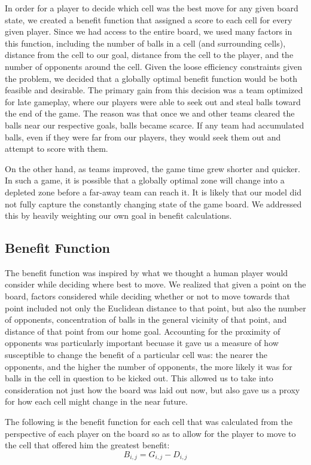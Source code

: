 \documentclass[
10pt, %
letterpaper, %
oneside, %
headinclude,footinclude, %
english
]{article}
\begin{document}
In order for a player to decide which cell was the best move for any given board state, we created a benefit function that assigned a score to each cell for every given player. Since we had access to the entire board, we used many factors in this function, including the number of balls in a cell (and surrounding cells), distance from the cell to our goal, distance from the cell to the player, and the number of opponents around the cell. Given the loose efficiency constraints given the problem, we decided that a globally optimal benefit function would be both feasible and desirable. The primary gain from this decision was a team optimized for late gameplay, where our players were able to seek out and steal balls toward the end of the game. The reason was that once we and other teams cleared the balls near our respective goals, balls became scarce. If any team had accumulated balls, even if they were far from our players, they would seek them out and attempt to score with them.

On the other hand, as teams improved, the game time grew shorter and quicker. In such a game, it is possible that a globally optimal zone will change into a depleted zone before a far-away team can reach it. It is likely that our model did not fully capture the constantly changing state of the game board. We addressed this by heavily weighting our own goal in benefit calculations.

\subsection{Benefit Function}
The benefit function was inspired by what we thought a human player would consider while deciding where best to move. We realized that given a point on the board, factors considered while deciding whether or not to move towards that point included not only the Euclidean distance to that point, but also the number of opponents, concentration of balls in the general vicinity of that point, and distance of that point from our home goal. Accounting for the proximity of opponents was particularly important becuase it gave us a measure of how susceptible to change the benefit of a particular cell was: the nearer the opponents, and the higher the number of opponents, the more likely it was for balls in the cell in question to be kicked out. This allowed us to take into consideration not just how the board was laid out now, but also gave us a proxy for how each cell might change in the near future.

The following is the benefit function for each cell that was calculated from the perspective of each player on the board so as to allow for the player to move to the cell that offered him the greatest benefit:
$$B_{i, j} = G_{i, j} - D_{i,j} $$
\end{document}
